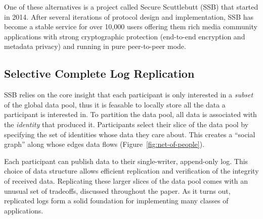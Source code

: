\documentclass[10pt,sigconf,rewiew]{acmart}
\begin{document}
One of these alternatives is a project called Secure Scuttlebutt (SSB)
that started in 2014. After several iterations of protocol design and
implementation, SSB has become a stable service for over 10,000 users
offering them rich media community applications with strong
cryptographic protection (end-to-end encryption and metadata privacy)
and running in pure peer-to-peer mode.

\subsection*{Selective Complete Log Replication}

SSB relies on the core insight that each  participant is only interested in a \textit{subset} of the global data pool, thus it is feasable to locally store all the data a participant is interested in. To partition the data pool, all data is associated with the \textit{identity} that produced it. Participants select their slice of the data pool by specifying the set of identities whose data they care about. This creates a ``social graph'' along whose edges data flows (Figure~\ref{fig:net-of-people}).

Each participant can publish data to their single-writer, append-only log. This choice of data structure allows efficient replication and verification of the integrity of received data. Replicating these larger slices of the data pool comes with an unusual set of tradeoffs, discussed throughout the paper. As it turns out, replicated logs form a solid foundation for implementing many classes of applications.

\end{document}
